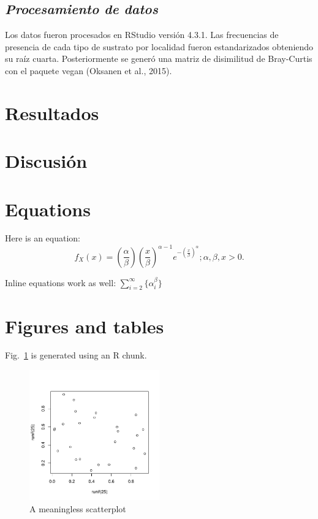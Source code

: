 \documentclass[
  authoryear,
  preprint,
  3p,
  twocolumn]{elsarticle}
\begin{document}
\hypertarget{procesamiento-de-datos}{%
\subsection{\texorpdfstring{\emph{Procesamiento de
datos}}{Procesamiento de datos}}\label{procesamiento-de-datos}}

Los datos fueron procesados en RStudio versión 4.3.1. Las frecuencias de
presencia de cada tipo de sustrato por localidad fueron estandarizados
obteniendo su raíz cuarta. Posteriormente se generó una matriz de
disimilitud de Bray-Curtis con el paquete vegan (Oksanen et al., 2015).

\hypertarget{resultados}{%
\section{Resultados}\label{resultados}}

\hypertarget{discusiuxf3n}{%
\section{Discusión}\label{discusiuxf3n}}

\hypertarget{equations}{%
\section{Equations}\label{equations}}

Here is an equation: \[ 
  f_{X}(x) = \left(\frac{\alpha}{\beta}\right)
  \left(\frac{x}{\beta}\right)^{\alpha-1}
  e^{-\left(\frac{x}{\beta}\right)^{\alpha}}; 
  \alpha,\beta,x > 0 .
\]

Inline equations work as well: \(\sum_{i = 2}^\infty\{\alpha_i^\beta\}\)

\hypertarget{figures-and-tables}{%
\section{Figures and tables}\label{figures-and-tables}}

Fig.~\ref{fig-meaningless} is generated using an R chunk.

\begin{figure}

{\centering \includegraphics[width=0.5\textwidth,height=\textheight]{Reporte_Campo_files/figure-pdf/fig-meaningless-1.pdf}

}

\caption{\label{fig-meaningless}A meaningless scatterplot}

\end{figure}
\end{document}
